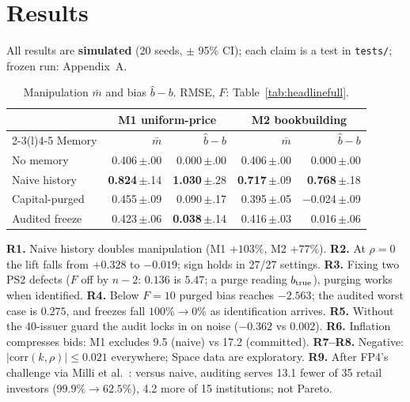 \balance
\section{Results}
All results are \textbf{simulated} (20 seeds, $\pm$ 95\% CI); each claim is a test in \texttt{tests/}; frozen run: Appendix~A.

\begin{table}[H]\centering\scriptsize
\caption{Manipulation $\bar m$ and bias $\hat b-b$. RMSE, $F$: Table~\ref{tab:headlinefull}.}
\label{tab:headline}
\setlength{\tabcolsep}{3.5pt}\renewcommand{\arraystretch}{0.95}
\begin{tabular}{@{}lrrrr@{}}\toprule
 & \multicolumn{2}{c}{M1 uniform-price} & \multicolumn{2}{c}{M2 bookbuilding}\\\cmidrule(lr){2-3}\cmidrule(l){4-5}
Memory & $\bar m$ & $\hat b-b$ & $\bar m$ & $\hat b-b$ \\\midrule
No memory      & 0.406\,\tiny$\pm$.00 & 0.000\,\tiny$\pm$.00 & 0.406\,\tiny$\pm$.00 & 0.000\,\tiny$\pm$.00 \\
Naive history  & \textbf{0.824}\,\tiny$\pm$.14 & \textbf{1.030}\,\tiny$\pm$.28 & \textbf{0.717}\,\tiny$\pm$.09 & \textbf{0.768}\,\tiny$\pm$.18 \\
Capital-purged & 0.455\,\tiny$\pm$.09 & 0.090\,\tiny$\pm$.17 & 0.395\,\tiny$\pm$.05 & $-$0.024\,\tiny$\pm$.09 \\
Audited freeze & 0.423\,\tiny$\pm$.06 & \textbf{0.038}\,\tiny$\pm$.14 & 0.416\,\tiny$\pm$.03 & 0.016\,\tiny$\pm$.06 \\\bottomrule
\end{tabular}
\end{table}

\textbf{R1.} Naive history doubles manipulation (M1 $+103\%$, M2 $+77\%$). \textbf{R2.} At $\rho=0$ the lift falls from $+0.328$ to $-0.019$; sign holds in 27/27 settings. \textbf{R3.} Fixing two PS2 defects ($F$ off by $n{-}2$: $0.136$ is $5.47$; a purge reading $b_{\rm true}$), purging works when identified. \textbf{R4.} Below $F=10$ purged bias reaches $-2.563$; the audited worst case is $0.275$, and freezes fall $100\%\!\to\!0\%$ as identification arrives. \textbf{R5.} Without the 40-issuer guard the audit locks in on noise ($-0.362$ vs $0.002$). \textbf{R6.} Inflation compresses bids: M1 excludes 9.5 (naive) vs 17.2 (committed). \textbf{R7--R8.} Negative: $|\mathrm{corr}(k,\rho)|\le0.021$ everywhere; Space data are exploratory. \textbf{R9.} After FP4's challenge via Milli et al.~\cite{milli2019}: versus naive, auditing serves 13.1 fewer of 35 retail investors ($99.9\%\!\to\!62.5\%$), 4.2 more of 15 institutions; not Pareto.

